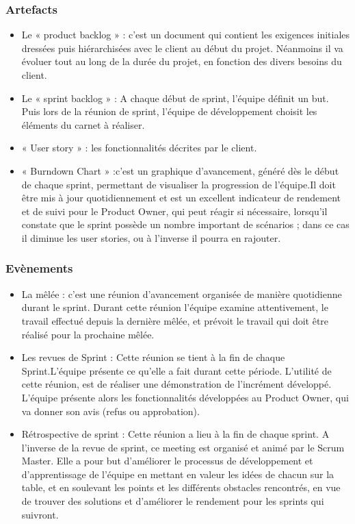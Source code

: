  \subsubsection{Artefacts}
 \begin{itemize}
     \item Le « product backlog » : c’est un document qui contient les exigences initiales dressées puis hiérarchisées avec le client au début du projet. Néanmoins il va évoluer tout au long de la durée du projet, en fonction des divers besoins du client.
\item Le « sprint backlog » : A chaque début de sprint, l’équipe définit un but. Puis lors de la réunion de sprint, l’équipe de développement choisit les éléments du carnet à réaliser. 
\item « User story » : les fonctionnalités décrites par le client.
\item	« Burndown Chart » :c’est un graphique d’avancement, généré dès le début de chaque sprint, permettant de visualiser la progression de l’équipe.Il doit être mis à jour quotidiennement et est un excellent indicateur de rendement et de suivi pour le Product Owner, qui peut réagir si nécessaire, lorsqu’il constate que le sprint possède un nombre important de scénarios ; dans ce cas il diminue les user stories, ou à l’inverse il pourra en rajouter.
 \end{itemize}
 
 \subsubsection{Evènements}
 \begin{itemize}
 \item La mêlée : c’est une réunion d’avancement organisée de manière quotidienne durant le sprint. Durant cette réunion l’équipe examine attentivement, le travail effectué depuis la dernière mêlée, et prévoit le travail qui doit être réalisé pour la prochaine mêlée.
 \item Les revues de Sprint : Cette réunion se tient à la fin de chaque Sprint.L’équipe présente ce qu'elle a fait durant cette période. L’utilité de cette réunion, est de réaliser une démonstration de l’incrément développé. L'équipe présente alors les fonctionnalités développées au Product Owner, qui va donner son avis (refus ou approbation).
 \item Rétrospective de sprint : Cette réunion a lieu à la fin de chaque sprint. A l’inverse de la revue de sprint, ce meeting est organisé et animé par le Scrum Master. Elle a pour but d’améliorer le processus de développement et d’apprentissage de l’équipe en mettant en valeur les idées de chacun sur la table, et en soulevant les points et les différents obstacles rencontrés, en vue de trouver des solutions et d'améliorer le rendement pour les sprints qui suivront.

 \end{itemize}
 
